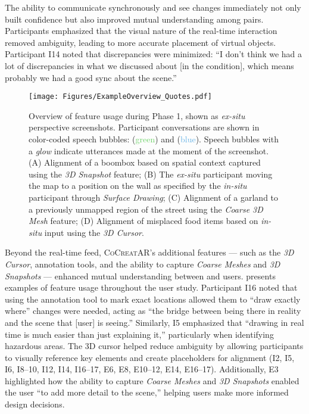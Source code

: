 The ability to communicate synchronously and see changes immediately not only built confidence but also improved mutual understanding among pairs. Participants emphasized that the visual nature of the real-time interaction removed ambiguity, leading to more accurate placement of virtual objects. Participant I14 noted that discrepancies were minimized: ``I don't think we had a lot of discrepancies in what we discussed about [in the \sync condition], which means probably we had a good sync about the scene.''

\begin{figure*}
    \centering
    \texttt{[image: Figures/ExampleOverview\_Quotes.pdf]}
    \caption{Overview of \SystemName feature usage during Phase 1, shown as \textit{ex-situ} perspective screenshots. Participant conversations are shown in color-coded speech bubbles: \insitu (\textcolor[HTML]{6DD268}{green}) and \exsitu (\textcolor[HTML]{67B3E6}{blue}). Speech bubbles with a \textit{glow} indicate utterances made at the moment of the screenshot. \textsf{(A)} Alignment of a boombox based on spatial context captured using the \textit{3D Snapshot} feature; \textsf{(B)} The \textit{ex-situ} participant moving the map to a position on the wall as specified by the \textit{in-situ} participant through \textit{Surface Drawing}; \textsf{(C)} Alignment of a garland to a previously unmapped region of the street using the \textit{Coarse 3D Mesh} feature; \textsf{(D)} Alignment of misplaced food items based on \textit{in-situ} input using the \textit{3D Cursor}.}
    \label{fig:example-overview}
\end{figure*}

Beyond the real-time feed, \textsc{CoCreatAR}'s additional features --- such as the \textit{3D Cursor}, annotation tools, and the ability to capture \textit{Coarse Meshes} and \textit{3D Snapshots} --- enhanced mutual understanding between \exsitu and \insitu users.  presents examples of feature usage throughout the user study. Participant I16 noted that using the annotation tool to mark exact locations allowed them to ``draw exactly where'' changes were needed, acting as ``the bridge between being there in reality and the scene that [\exsitu user] is seeing.'' Similarly, I5 emphasized that ``drawing in real time is much easier than just explaining it,'' particularly when identifying hazardous areas. The 3D cursor helped reduce ambiguity by allowing participants to visually reference key elements and create placeholders for alignment (I2, I5, I6, I8–10, I12, I14, I16–17, E6, E8, E10–12, E14, E16–17). Additionally, E3 highlighted how the ability to capture \textit{Coarse Meshes} and \textit{3D Snapshots} enabled the \insitu user ``to add more detail to the scene,'' helping \exsitu users make more informed design decisions.

